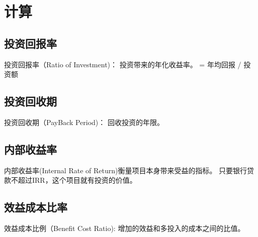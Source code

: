 
\chapter{计算}

\section{投资回报率}


投资回报率（Ratio of Investment)： 投资带来的年化收益率。
= 年均回报 / 投资额



\section{投资回收期}


投资回收期（PayBack Period)： 回收投资的年限。

\section{内部收益率}

内部收益率(Internal Rate of Return)衡量项目本身带来受益的指标。
只要银行贷款不超过IRR，这个项目就有投资的价值。


\section{效益成本比率}

效益成本比例（Benefit Cost Ratio): 增加的效益和多投入的成本之间的比值。
